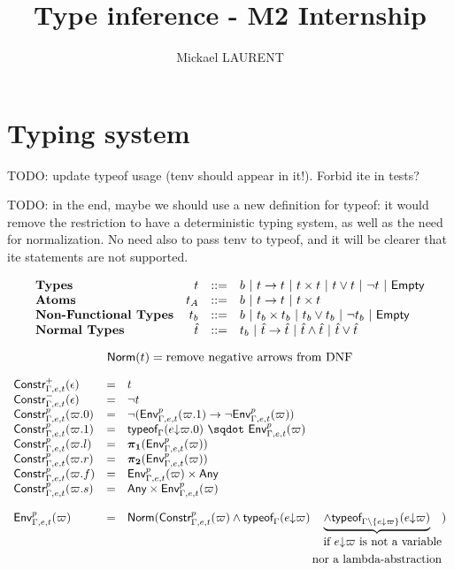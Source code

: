 \documentclass[a4paper]{article}
\title{\vspace{1.5cm}Type inference - M2 Internship}
\author{Mickael LAURENT}
\date{\vspace{-5ex}}
\theoremstyle{definition}
\begin{document}
    \maketitle

    \section{Typing system}

    TODO: update typeof usage (tenv should appear in it!). Forbid ite in tests?

    TODO: in the end, maybe we should use a new definition for typeof: it would remove the restriction to have a deterministic typing system,
    as well as the need for normalization. No need also to pass tenv to typeof, and it will be clearer that ite statements are not supported.

    \[
      \begin{array}{lrcl}
      \textbf{Types} & t & ::= & b~|~ t\to t~|~ t\times t~|~ t\vee t ~|~ \neg t ~|~ \textsf{Empty}\\
      \textbf{Atoms} & t_A & ::= & b~|~ t\to t~|~ t\times t\\
      \textbf{Non-Functional Types} & t_b & ::= & b ~|~ t_b\times t_b ~|~ t_b\vee t_b ~|~ \neg t_b ~|~ \textsf{Empty}\\
      \textbf{Normal Types} & \hat t & ::= & t_b ~|~ \hat t\to \hat t~|~ \hat t \wedge \hat t ~|~ \hat t\vee \hat t
      \end{array}
    \]

    \[
      \textsf{Norm}(t) = \text{remove negative arrows from DNF}
    \]

    \[
    \begin{array}{lcl}
      \typep+\epsilon{\Gamma,e,t} & = & t\\
      \typep-\epsilon{\Gamma,e,t} & = & \neg t\\
      \typep{p}{\varpi.0}{\Gamma,e,t} & = & \neg(\arrow{\Gp p{\Gamma,e,t}{(\varpi.1)}}{\neg \Gp p {\Gamma,e,t} (\varpi)})\\
      \typep{p}{\varpi.1}{\Gamma,e,t} & = & \worra{\tyof{\occ e{\varpi.0}}\Gamma}{\Gp p {\Gamma,e,t} (\varpi)}\\
      \typep{p}{\varpi.l}{\Gamma,e,t} & = & \bpl{\Gp p {\Gamma,e,t} (\varpi)}\\
      \typep{p}{\varpi.r}{\Gamma,e,t} & = & \bpr{\Gp p {\Gamma,e,t} (\varpi)}\\
      \typep{p}{\varpi.f}{\Gamma,e,t} & = & \pair{\Gp p {\Gamma,e,t} (\varpi)}\Any\\
      \typep{p}{\varpi.s}{\Gamma,e,t} & = & \pair\Any{\Gp p {\Gamma,e,t} (\varpi)}\\ \\
      \Gp p {\Gamma,e,t} (\varpi) & = & \norm {\typep p \varpi {\Gamma,e,t} \land \tyof {\occ e \varpi} \Gamma
    \underbrace{\land \tyof {\occ e \varpi} {\Gamma\setminus\{\occ e \varpi\}}}_{\begin{split}\text{if $\occ e \varpi$ is not a variable}&\\ \text{nor a lambda-abstraction}&\end{split}}}\\
    \end{array}
    \]
\end{document}
